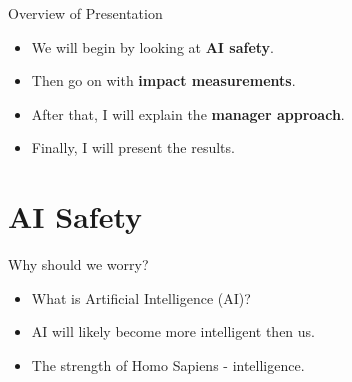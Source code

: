 \documentclass[10pt]{beamer}
\begin{document}
\begin{frame}{Overview of Presentation}
  \begin{itemize}[<+- | alert@+>]
    \item We will begin by looking at \textbf{AI safety}.
    \item Then go on with \textbf{impact measurements}.
    \item After that, I will explain the \textbf{manager approach}.
    \item Finally, I will present the results.
  \end{itemize}
\end{frame}


\section{AI Safety}

\begin{frame}{Why should we worry?}
  \begin{itemize}[<+- | alert@+>]
    \item What is Artificial Intelligence (AI)?
    \item AI will likely become more intelligent then us.
    \item The strength of Homo Sapiens - intelligence.
  \end{itemize}
   
\end{frame}
\end{document}
